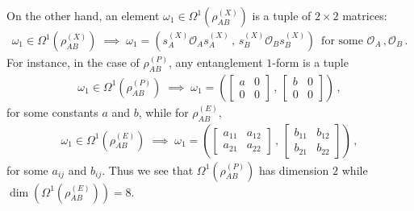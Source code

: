 \documentclass[12pt]{article}
\numberwithin{equation}{section}
\begin{document}
On the other hand, an element $\omega_1 \in \Omega^1 \left( \rho_{AB}^{(X)} \right)$ is a tuple of $2 \times 2$ matrices:
%
\begin{align}
    \omega_1 \in \Omega^1 ( \rho_{AB}^{(X)} ) \; \implies \; \omega_1 = \left( s_{A}^{(X)} \mathcal{O}_{A} s_{A}^{(X)} \, , \, s_{B}^{(X)} \mathcal{O}_{B} s_{B}^{(X)} \right) \, \text{ for some } \mathcal{O}_{A} \, , \mathcal{O}_B \, .
\end{align}
%
For instance, in the case of $\rho_{AB}^{(P)}$, any entanglement $1$-form is a tuple
%
\begin{align}\label{factorized_one_form}
    \omega_1 \in \Omega^1 ( \rho_{AB}^{(P)} ) \; \implies \; \omega_1 = \left( \begin{bmatrix} a & 0 \\ 0 & 0 \end{bmatrix} \, , \, \begin{bmatrix} b & 0 \\ 0 & 0 \end{bmatrix} \right) \, ,
\end{align}
%
for some constants $a$ and $b$, while for $\rho_{AB}^{(E)}$, 
%
\begin{align}\label{general_entangled_one_form}
    \omega_1 \in \Omega^1 ( \rho_{AB}^{(E)} ) \; \implies \; \omega_1 = \left( \begin{bmatrix} a_{11} & a_{12} \\ a_{21} & a_{22} \end{bmatrix} \, , \, \begin{bmatrix} b_{11} & b_{12} \\ b_{21} & b_{22} \end{bmatrix} \right) \, ,
\end{align}
%
for some $a_{ij}$ and $b_{ij}$. Thus we see that $\Omega^1 ( \rho_{AB}^{(P)} )$ has dimension $2$ while $\dim \left( \Omega^1 ( \rho_{AB}^{(E)} ) \right) = 8$.
\end{document}
